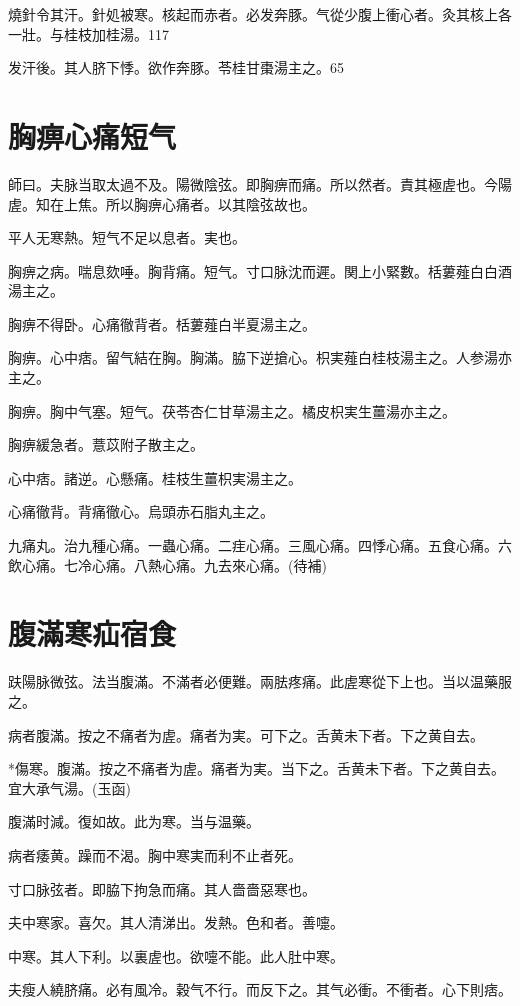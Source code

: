 \documentclass[b5paper,twoside,zihao=-4,UTF8]{ctexbook}
\begin{document}
燒針令其汗。針処被寒。核起而赤者。必发奔豚。气從少腹上衝心者。灸其核上各一壯。与桂枝加桂湯。117

发汗後。其人脐下悸。欲作奔豚。苓桂甘棗湯主之。65

\chapter{胸痹心痛短气}

師曰。夫脉当取太過不及。陽微陰弦。即胸痹而痛。所以然者。責其極虗也。今陽虗。知在上焦。所以胸痹心痛者。以其陰弦故也。

平人无寒熱。短气不足以息者。実也。

胸痹之病。喘息欬唾。胸背痛。短气。寸口脉沈而遲。関上小緊數。栝蔞薤白白酒湯主之。

胸痹不得卧。心痛徹背者。栝蔞薤白半夏湯主之。

胸痹。心中痞。留气結在胸。胸滿。脇下逆搶心。枳実薤白桂枝湯主之。人参湯亦主之。

胸痹。胸中气塞。短气。茯苓杏仁甘草湯主之。橘{皮}枳{実生}薑湯亦主之。

胸痹緩急者。薏苡附子散主之。

心中痞。諸逆。心懸痛。桂枝生薑枳実湯主之。

心痛徹背。背痛徹心。烏頭赤石脂丸主之。

九痛丸。治九種心痛。一蟲心痛。二疰心痛。三風心痛。四悸心痛。五食心痛。六飲心痛。七冷心痛。八熱心痛。九去來心痛。(待補)

\chapter{腹滿寒疝宿食}

趺陽脉微弦。法当腹滿。不滿者必便難。兩胠疼痛。此虗寒從下上也。当以温藥服之。

病者腹滿。按之不痛{者}为虗。痛者为実。可下之。舌黄未下者。下之黄自去。

*傷寒。腹滿。按之不痛者为虗。痛者为実。当下之。舌黄未下者。下之黄自去。宜大承气湯。(玉函)

腹滿时減。復如故。此为寒。当与温藥。

病者痿黄。躁而不渴。胸中寒実而利不止者死。

寸口脉弦者。即脇下拘急而痛。其人嗇嗇惡寒也。

夫中寒家。喜欠。其人清涕出。发熱。色和者。善嚏。

中寒。其人下利。以裏虗也。欲嚏不能。此人肚中寒。

夫瘦人繞脐痛。必有風冷。穀气不行。而反下之。其气必衝。不衝者。心下則痞。
\end{document}
